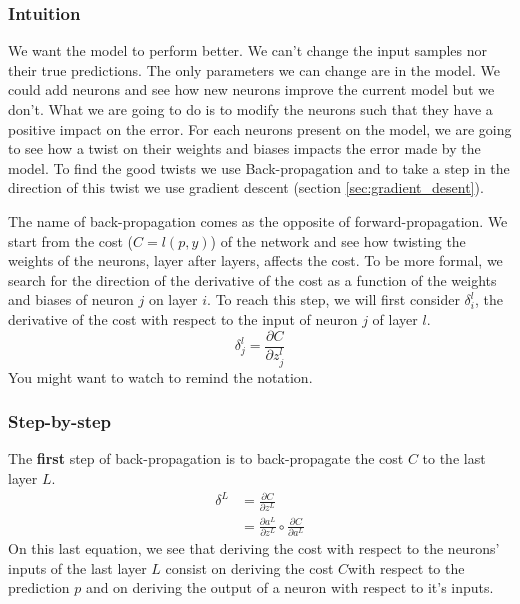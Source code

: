 		\subsubsection{Intuition}
			We want the model to perform better. We can't change the input samples nor their true predictions. The only parameters we can change are in the model. We could add neurons and see how new neurons improve the current model but we don't. What we are going to do is to modify the neurons such that they have a positive impact on the error. For each neurons present on the model, we are going to see how a twist on their weights and biases impacts the error made by the model. To find the good twists we use Back-propagation and to take a step in the direction of this twist we use gradient descent (section \ref{sec:gradient_desent}).

			The name of back-propagation comes as the opposite of forward-propagation. We start from the cost ($C=l(p,y)$) of the network and see how twisting the weights of the neurons, layer after layers, affects the cost. To be more formal, we search for the direction of the derivative of the cost as a function of the weights and biases of neuron $j$ on layer $i$. To reach this step, we will first consider $\delta^l_i$, the derivative of the cost with respect to the input of neuron $j$ of layer $l$.
			$$ \delta^l_j = \frac{\partial C}{\partial z^l_j } $$
			You might want to watch  to remind the notation.

		\subsubsection{Step-by-step}
			The \textbf{first} step of back-propagation is to back-propagate the cost $C$ to the last layer $L$.
			\begin{equation}
				\begin{split}
					\delta^L
					&= \frac{\partial C}{\partial z^L } \\
					&= \frac{\partial a^L }{\partial z^L } \circ \frac{\partial C}{\partial a^L }
				\end{split}
			\end{equation}
			On this last equation, we see that deriving the cost with respect to the neurons' inputs of the last layer $L$ consist on deriving the cost $C$with respect to the prediction $p$ and on deriving the output of a neuron with respect to it's inputs. 


